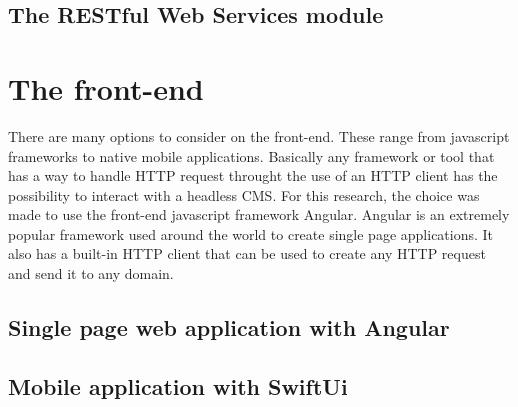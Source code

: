 \subsection{The  RESTful Web Services module}

\section{The front-end}

There are many options to consider on the front-end. These range from javascript frameworks to native mobile applications. Basically any framework or tool that has a way to handle HTTP request throught the use of an HTTP client has the possibility to interact with a headless CMS. For this research, the choice was made to use the front-end javascript framework Angular. Angular is an extremely popular framework used around the world to create single page applications. It also has a built-in HTTP client that can be used to create any HTTP request and send it to any domain.

\subsection{Single page web application with Angular}

\subsection{Mobile application with SwiftUi}